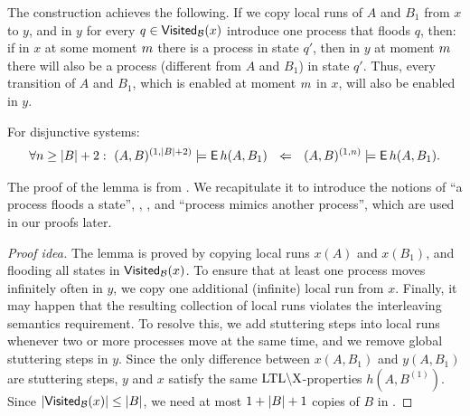The construction achieves the following. 
If we copy local runs of $A$ and $B_1$ from $x$ to $y$, 
and in $y$ for every $q \in \mathsf{Visited}_{\mathcal{B}}(x)$ introduce one process that floods $q$, 
then: 
if in $x$ at some moment $m$ there is a process in state $q'$, 
then in $y$ at moment $m$ there will also be a process (different from 
$A$ and $B_1$) in state $q'$. Thus, every transition of $A$
 and $B_1$, which is enabled at moment $m$ in $x$, will also be enabled in $y$. 

\begin{lemma} \label{disj:le:NonFairDisjunctiveBounding}
    For disjunctive systems:
    \begin{align*}
    \forall n \geq |B|+2:\ 
    (A,B)^{(1,|B|+2)} \models \pexists h(A,B_1)
    \ \ \Implied \ \ 
    \largesys \models \pexists h(A,B_1).
    \end{align*}
\end{lemma}

The proof of the lemma is from \cite[Lemma 4.1.2]{Emerson00}. 
We recapitulate it to introduce the notions of ``a process floods a state'', 
\destutter, \interleave, and ``process mimics another process'',
which are used in our proofs later.

\begin{proof}[Proof idea]
The lemma is proved by copying local runs $x(A)$ and $x(B_1)$,
and flooding all states in $\mathsf{Visited}_{\mathcal{B}}(x)$.
To ensure that at least one process moves infinitely often
in $y$, we copy one additional (infinite) local run from $x$. Finally, it may
happen that the resulting collection of local runs violates the interleaving 
semantics requirement. To resolve this, we add stuttering steps into local 
runs whenever two or more processes move at the same time, and we 
remove global stuttering steps in $y$. Since the only difference between 
$x(A,B_1)$ and $y(A,B_1)$ are stuttering steps, $y$ and $x$ satisfy the same $
\text{LTL}\backslash\text{X}$-properties $h(A,B^{(1)})$. 
Since $\left| {\mathsf{Visited}_{\mathcal{B}}(x)} \right| \leq 
\left| {B} \right|$, we need at most $1+\left| {B} \right|+1$ copies of $B$ in \cutoffsys.
\end{proof}

